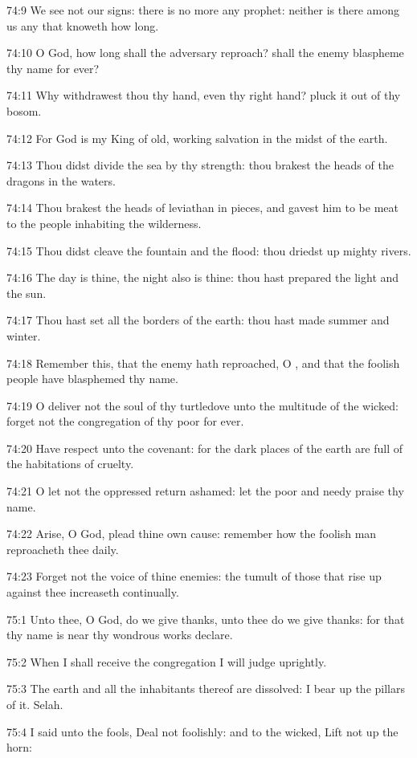 74:9 We see not our signs: there is no more any prophet: neither is there among us any that knoweth how long.

74:10 O God, how long shall the adversary reproach? shall the enemy blaspheme thy name for ever?

74:11 Why withdrawest thou thy hand, even thy right hand? pluck it out of thy bosom.

74:12 For God is my King of old, working salvation in the midst of the earth.

74:13 Thou didst divide the sea by thy strength: thou brakest the heads of the dragons in the waters.

74:14 Thou brakest the heads of leviathan in pieces, and gavest him to be meat to the people inhabiting the wilderness.

74:15 Thou didst cleave the fountain and the flood: thou driedst up mighty rivers.

74:16 The day is thine, the night also is thine: thou hast prepared the light and the sun.

74:17 Thou hast set all the borders of the earth: thou hast made summer and winter.

74:18 Remember this, that the enemy hath reproached, O \LORD, and that the foolish people have blasphemed thy name.

74:19 O deliver not the soul of thy turtledove unto the multitude of the wicked: forget not the congregation of thy poor for ever.

74:20 Have respect unto the covenant: for the dark places of the earth are full of the habitations of cruelty.

74:21 O let not the oppressed return ashamed: let the poor and needy praise thy name.

74:22 Arise, O God, plead thine own cause: remember how the foolish man reproacheth thee daily.

74:23 Forget not the voice of thine enemies: the tumult of those that rise up against thee increaseth continually.



75:1 Unto thee, O God, do we give thanks, unto thee do we give thanks: for that thy name is near thy wondrous works declare.

75:2 When I shall receive the congregation I will judge uprightly.

75:3 The earth and all the inhabitants thereof are dissolved: I bear up the pillars of it. Selah.

75:4 I said unto the fools, Deal not foolishly: and to the wicked, Lift not up the horn:

